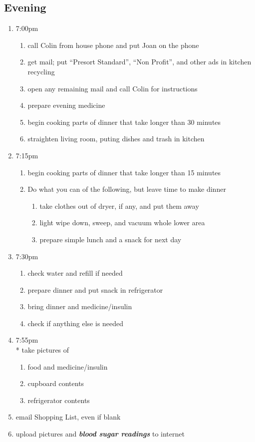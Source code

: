 \documentclass[12pt,letterpaper]{article}
\begin{document}
\begin{multicols}{2}
\subsection*{Evening}
\begin{enumerate}
	\item 7:00pm
		\begin{enumerate}
			\item call Colin from house phone and put Joan on the phone
			\item get mail; put ``Presort Standard'', ``Non Profit'', and other ads in kitchen recycling
			\item open any remaining mail and call Colin for instructions
			\item prepare evening medicine
			\item begin cooking parts of dinner that take longer than 30 minutes
			\item straighten living room, puting dishes and trash in kitchen
		\end{enumerate}
	\item 7:15pm 
		\begin{enumerate}
			\item begin cooking parts of dinner that take longer than 15 minutes
			\item	Do what you can of the following, but leave time to make dinner
				\begin{enumerate}
					\item take clothes out of dryer, if any, and put them away
					\item light wipe down, sweep, and vacuum whole lower area
					\item prepare simple lunch and a snack for next day
				\end{enumerate}
		\end{enumerate}
	\item 7:30pm
		\begin{enumerate}
			\item check water and refill if needed
			\item prepare dinner and put snack in refrigerator
			\item bring dinner and medicine/insulin
			\item check if anything else is needed
		\end{enumerate}
	\item 7:55pm \\*
		take pictures of 
		\begin{enumerate}
			\item food and medicine/insulin
			\item	cupboard contents
			\item	refrigerator contents
		\end{enumerate}
	\item email Shopping List, even if blank
	\item upload pictures and \textit{\textbf{blood sugar readings}} to internet
\end{enumerate}
\end{multicols}
\end{document}
